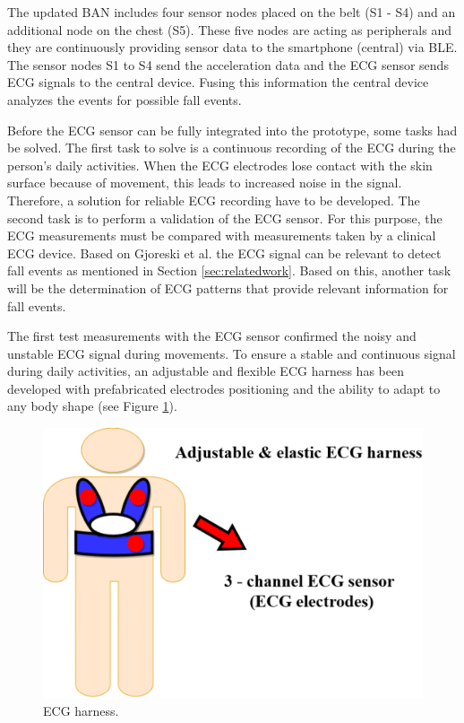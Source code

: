 \documentclass[10pt,journal,compsoc]{IEEEtran}
\begin{document}
The updated BAN includes four sensor nodes placed on the belt (S1 - S4) and an additional node on the chest (S5). These five nodes are acting as peripherals and they are continuously providing sensor data to the smartphone (central) via BLE. The sensor nodes S1 to S4 send the acceleration data and the ECG sensor sends ECG signals to the central device. Fusing this information the central device analyzes the events for possible fall events.

Before the ECG sensor can be fully integrated into the prototype, some tasks had be solved. The first task to solve is a continuous recording of the ECG during the person's daily activities. When the ECG electrodes lose contact with the skin surface because of movement, this leads to increased noise in the signal. Therefore, a solution for reliable ECG recording have to be developed. The second task is to perform a validation of the ECG sensor. For this purpose, the  ECG measurements must be compared with measurements taken by a clinical ECG device. Based on Gjoreski et al. \cite{Gjoreski2014} the ECG signal can be relevant to detect fall events as mentioned in Section \ref{sec:relatedwork}. Based on this, another task will be the determination of ECG patterns that provide relevant information for fall events.

The first test measurements with the ECG sensor confirmed the noisy and unstable ECG signal during movements. To ensure a stable and continuous signal during daily activities, an adjustable and flexible ECG harness has been developed with prefabricated electrodes positioning and the ability to adapt to any body shape (see Figure \ref{fig:ECGHarness}).
\begin{figure}[!ht]
	\centering
	\includegraphics[scale=0.29]{Images/ECG-Harness.eps}
	\caption[ECG - Harness]{ECG harness.}
	\label{fig:ECGHarness}
\end{figure}
\end{document}
